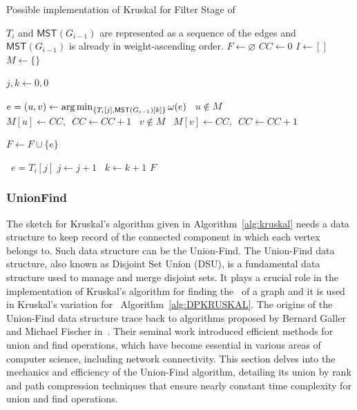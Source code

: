 \begin{algorithm}
\caption{Possible implementation of Kruskal for Filter Stage of \DPmst\ \label{alg:DPKRUSKAL}}
\begin{algorithmic}
    \Require $T_i$ and $\mathsf{MST}(G_{i-1})$ are represented as a sequence of the edges and $\mathsf{MST}(G_{i-1})$ is already in weight-ascending order.
        \State $F \gets \varnothing$
        \State {} 
        \State $CC \gets 0$ 
        \State $I \gets []$ 
        \State $M \gets \{\}$ 

        \State $j, k \gets 0, 0$ 

            \State $e = (u,v) \gets \operatorname*{arg\,min}_{\{T_i[j], \mathsf{MST}(G_{i-1})[k]\}} \omega(e)$
            \State \algorithmicif\ {$u \notin M$} \algorithmicthen\  $M[u] \gets CC,\,\,\,CC \gets CC + 1$ 
            \State \algorithmicif\ {$v \notin M$} \algorithmicthen\ $M[v] \gets CC,\,\,\,CC \gets CC + 1$ 
            
                \State $F \gets F \cup \{e\}$
                \State {}
            \EndIf

            \State \algorithmicif\ {$e = T_i[j]$} \algorithmicthen $j \gets j + 1$
            \State \algorithmicelse\ $k \gets k + 1$ 
        \EndWhile
        \State \Return $F$
    \EndProcedure
\end{algorithmic}
\end{algorithm}


\subsubsection*{UnionFind}

The sketch for Kruskal's algorithm given in Algorithm~\ref{alg:kruskal} needs a data structure to keep record of the connected component in which each vertex belongs to. Such data structure can be the Union-Find. The Union-Find data structure, also known as Disjoint Set Union (DSU), is a fundamental data structure used to manage and merge disjoint sets. It plays a crucial role in the implementation of Kruskal's algorithm for finding the \mst\ of a graph and it is used in Kruskal's variation for \DPmst\ Algorithm~\ref{alg:DPKRUSKAL}. The origins of the Union-Find data structure trace back to algorithms proposed by Bernard Galler and Michael Fischer in~\cite{Galler1964}. Their seminal work introduced efficient methods for union and find operations, which have become essential in various areas of computer science, including network connectivity. This section delves into the mechanics and efficiency of the Union-Find algorithm, detailing its union by rank and path compression techniques that ensure nearly constant time complexity for union and find operations.

